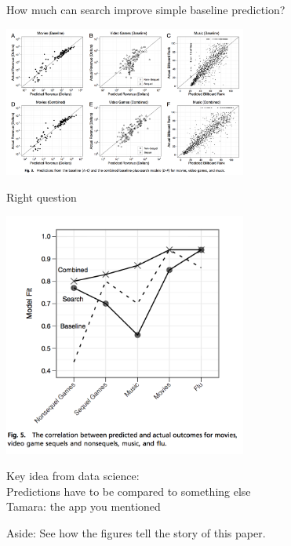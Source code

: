 \documentclass[aspectratio=169]{beamer}
\def\vf{\vfill}
\begin{document}
\begin{frame}

How much can search improve simple baseline prediction?
\pause
\begin{center}
\includegraphics[width=0.6\textwidth]{figures/goel_predicting_2010_fig3}
\end{center}
\pause
\vf
Right question

\end{frame}
\begin{frame}

\begin{center}
\includegraphics[width=0.6\textwidth]{figures/goel_predicting_2010_fig5}
\end{center}

\end{frame}
\begin{frame}

Key idea from data science:\\
Predictions have to be compared to something else\\
\pause
Tamara: the app you mentioned

\end{frame}
\begin{frame}

{\Large
\begin{center}
Aside: See how the figures tell the story of this paper.
\end{center}
}

\end{frame}
\end{document}

